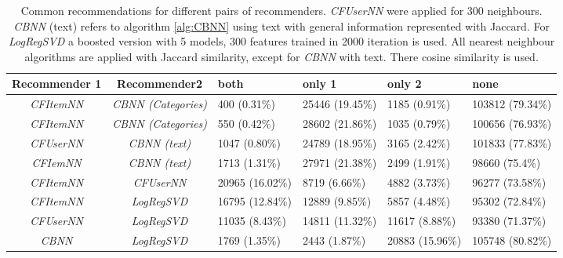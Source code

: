 \documentclass[10pt]{reportMaster}
\begin{document}
\begin{table}
	\begin{tabular}{|c|c||p{1.2cm}|p{1.2cm}|p{1.2cm}|p{1.2cm}|}
		\hline
		\textbf{Recommender 1}&\textbf{Recommender2}&\textbf{both}&\textbf{only 1}&\textbf{only 2}&\textbf{none}\\ \hline
		\textit{CFItemNN}&\textit{CBNN (Categories)}&400 (0.31\%)&25446 (19.45\%)&1185 (0.91\%)&103812 (79.34\%)\\ \hline
		\textit{CFItemNN}&\textit{CBNN (Categories)}&550 (0.42\%)&28602 (21.86\%)&1035 (0.79\%)&100656 (76.93\%) \\ \hline
		\textit{CFUserNN}&\textit{CBNN (text)}&1047 (0.80\%)&24789 (18.95\%)&3165 (2.42\%)&101833 (77.83\%) \\ \hline
		\textit{CFIemNN}&\textit{CBNN (text)}&1713 (1.31\%)&27971 (21.38\%)&2499 (1.91\%)&98660 (75.4\%) \\ \hline
		\textit{CFItemNN}&\textit{CFUserNN}&20965 (16.02\%)&8719 (6.66\%)&4882 (3.73\%)&96277 (73.58\%) \\ \hline
		\textit{CFItemNN}&\textit{LogRegSVD}&16795 (12.84\%)&12889 (9.85\%)&5857 (4.48\%)&95302 (72.84\%) \\ \hline
		\textit{CFUserNN}&\textit{LogRegSVD}&11035 (8.43\%)&14811 (11.32\%)&11617 (8.88\%)&93380 (71.37\%) \\ \hline
		 \textit{CBNN}&\textit{LogRegSVD}&1769 (1.35\%)&2443 (1.87\%)&20883 (15.96\%)&105748 (80.82\%)\\ \hline
	\end{tabular}
	\caption{Common recommendations for different pairs of recommenders. \textit{CFUserNN} were applied for 300 neighbours. \textit{CBNN} (text) refers to algorithm \ref{alg:CBNN} using text with general information represented with Jaccard. For \textit{LogRegSVD} a boosted version with 5 models, 300 features trained in 2000 iteration is used. All nearest neighbour algorithms are applied with Jaccard similarity, except for \textit{CBNN} with text. There cosine similarity is used.}
\label{tab:correlation}
\end{table}
\end{document}
